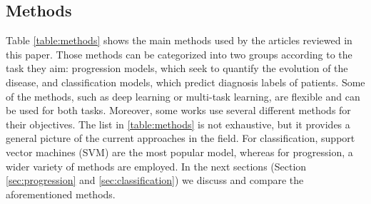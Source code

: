 \subsection{Methods}

Table \ref{table:methods} shows the main methods used by the articles reviewed in this paper. Those methods can be  categorized into two groups according to the task they aim: progression models, which seek to quantify the evolution of the disease, and classification models, which predict diagnosis labels of patients. Some of the methods, such as deep learning or multi-task learning, are flexible and can be used for both tasks. Moreover, some works use several different methods for their objectives. The list in \ref{table:methods} is not exhaustive, but it provides a general picture of the current approaches in the field. For classification, support vector machines (SVM) are the most popular model, whereas for progression, a wider variety of methods are employed. In the next sections (Section \ref{sec:progression} and \ref{sec:classification}) we discuss and compare the aforementioned methods. 

